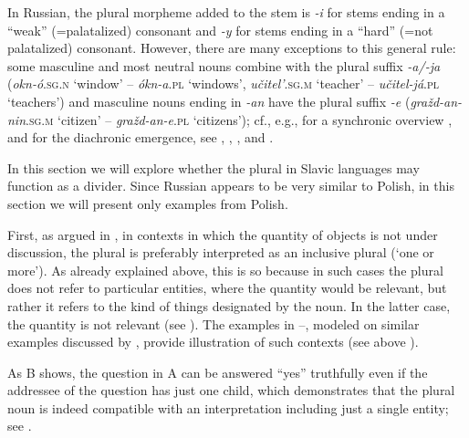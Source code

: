 \documentclass[output=paper,colorlinks,citecolor=brown]{langscibook}
\begin{document}
In Russian, the plural morpheme added to the stem is \textit{-i} for stems ending in a ``weak'' (=palatalized) consonant and \textit{-y} for stems ending in a ``hard'' (=not palatalized) consonant. However, there are many exceptions to this general rule: some masculine and most neutral nouns combine with the plural suffix \textit{-a/-ja} (\textit{okn-ó}.\textsc{sg.n} `window' --  \textit{ókn-a}.\textsc{pl} `windows', \textit{učitel'}.\textsc{sg.m} `teacher' --  \textit{učitel-já}.\textsc{pl} `teachers') and masculine nouns ending in \textit{-an} have the plural suffix \textit{-e} (\textit{gražd-an-nin}.\textsc{sg.m} `citizen' -- \textit{gražd-an-e}.\textsc{pl} `citizens'); cf., e.g., for a synchronic overview \citet[169ff]{SvedovaV1990}, and for the diachronic emergence, see \citet{Miklosich1868}, \citet{Vondrak1928}, \citet{Kiparsky1963}, and 
\citet{Isacenko1962,Issatschenko1980, Issatschenko1983}.  

In this section we will explore whether the plural in Slavic languages may function as a divider. Since Russian appears to be very similar to Polish, in this section we will present only examples from Polish. 

First, as argued in \citet{Grimm2013}, in contexts in which the quantity of objects is not under discussion, the plural is preferably interpreted as an inclusive plural (`one or more'). As already explained above, this is so because in such cases the plural does not refer to particular entities, where the quantity would be relevant, but rather it refers to the kind of things designated by the noun. In the latter case, the quantity is not relevant (see \citealt[\S 1]{Grimm2013}). The examples in --, modeled on similar examples discussed by \citet{Grimm2013}, provide illustration of such contexts (see above ).

\eanoraggedright
\begin{xlist}
\end{xlist}\label{ex:geist:15}
\z

\noindent As B shows, the question in A can be answered ``yes'' truthfully even if the addressee of the question has just one child, which demonstrates that the plural noun is indeed compatible with an interpretation including just a single entity; see \citep{Grimm2013}.
\end{document}
